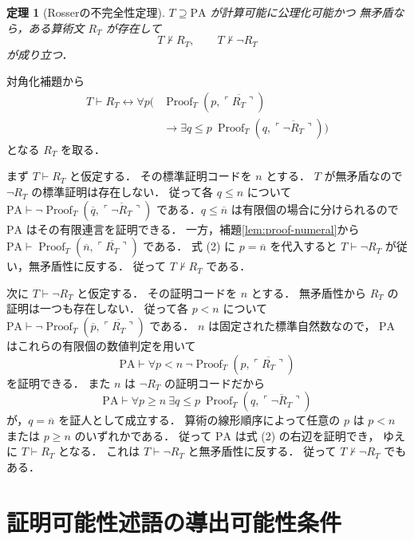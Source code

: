 \documentclass[a5paper,10pt,onecolumn]{jsarticle}
\makeatletter
\theoremstyle{mathnotetheorem}
\newtheorem{theorem}{定理}[section]
\renewcommand{\proofname}{証明}
\renewenvironment{proof}[1][\proofname]{%
  \par\pushQED{\qed}\normalfont\topsep4\p@\@plus2\p@\relax
  \trivlist\item[\hskip\labelsep\bfseries #1]\ignorespaces
}{\popQED\endtrivlist\@endpefalse}
\makeatother
\begin{document}
\begin{theorem}[Rosserの不完全性定理]\label{thm:rosser}
$T\supseteq\mathrm{PA}$ が計算可能に公理化可能かつ
無矛盾なら，ある算術文 $R_T$ が存在して
\[
 T\not\vdash R_T,\qquad T\not\vdash\neg R_T
\]
が成り立つ．
\end{theorem}
\begin{proof}
対角化補題から
\[
 \begin{aligned}
 T\vdash R_T\leftrightarrow
 \forall p\bigl(&\operatorname{Proof}_T(
 p,\overline{\ulcorner R_T\urcorner})\\
 &\to\exists q\le p\
 \operatorname{Proof}_T(
 q,\overline{\ulcorner\neg R_T\urcorner})\bigr)
 \end{aligned}
 \tag{2}
\]
となる $R_T$ を取る．

まず $T\vdash R_T$ と仮定する．
その標準証明コードを $n$ とする．
$T$ が無矛盾なので $\neg R_T$ の標準証明は存在しない．
従って各 $q\le n$ について
$\mathrm{PA}\vdash\neg\operatorname{Proof}_T(
 \overline q,\overline{\ulcorner\neg R_T\urcorner})$
である．$q\le\overline n$ は有限個の場合に分けられるので
$\mathrm{PA}$ はその有限連言を証明できる．
一方，補題\ref{lem:proof-numeral}から
$\mathrm{PA}\vdash\operatorname{Proof}_T(
\overline n,\overline{\ulcorner R_T\urcorner})$
である．
式 (2) に $p=\overline n$ を代入すると
$T\vdash\neg R_T$ が従い，無矛盾性に反する．
従って $T\not\vdash R_T$ である．

次に $T\vdash\neg R_T$ と仮定する．
その証明コードを $n$ とする．
無矛盾性から $R_T$ の証明は一つも存在しない．
従って各 $p<n$ について
$\mathrm{PA}\vdash\neg\operatorname{Proof}_T(
 \overline p,\overline{\ulcorner R_T\urcorner})$
である．
$n$ は固定された標準自然数なので，
$\mathrm{PA}$ はこれらの有限個の数値判定を用いて
\[
 \mathrm{PA}\vdash\forall p<n\
 \neg\operatorname{Proof}_T(
 p,\overline{\ulcorner R_T\urcorner})
\]
を証明できる．
また $n$ は $\neg R_T$ の証明コードだから
\[
 \mathrm{PA}\vdash\forall p\ge n\
 \exists q\le p\
 \operatorname{Proof}_T(
 q,\overline{\ulcorner\neg R_T\urcorner})
\]
が，$q=\overline n$ を証人として成立する．
算術の線形順序によって任意の $p$ は
$p<n$ または $p\ge n$ のいずれかである．
従って $\mathrm{PA}$ は式 (2) の右辺を証明でき，
ゆえに $T\vdash R_T$ となる．
これは $T\vdash\neg R_T$ と無矛盾性に反する．
従って $T\not\vdash\neg R_T$ でもある．
\end{proof}

\section{証明可能性述語の導出可能性条件}
\end{document}
